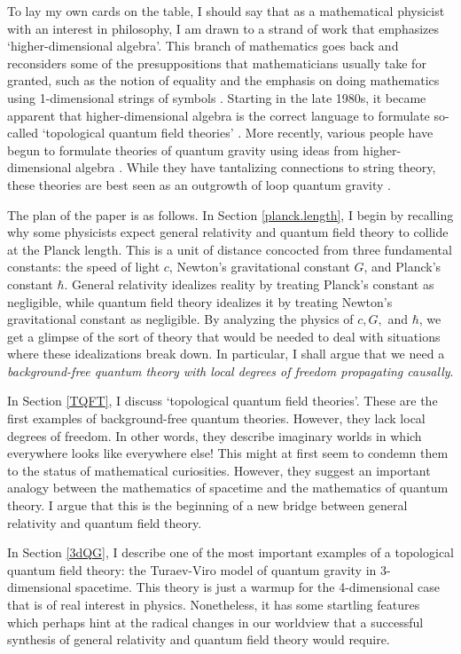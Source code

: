 \documentclass[12pt,amsfonts]{article}
\begin{document}
To lay my own cards on the table, I should say that as a mathematical
physicist with an interest in philosophy, I am drawn to a strand of work
that emphasizes `higher-dimensional algebra'.  This branch of
mathematics goes back and reconsiders some of the presuppositions that
mathematicians usually take for granted, such as the notion of equality
\cite{BD2} and the emphasis on doing mathematics using 1-dimensional
strings of symbols \cite{Brown,Kauffman}.  Starting in the late 1980s,
it became apparent that higher-dimensional algebra is the correct
language to formulate so-called `topological quantum field theories'
\cite{BD,L,Turaev}.  More recently, various people have begun to formulate
theories of quantum gravity using ideas from higher-dimensional algebra
\cite{B3,BC,FK,MS,Reis}.  While they have tantalizing connections to string
theory, these theories are best seen as an outgrowth of loop quantum
gravity \cite{RR}.  

The plan of the paper is as follows.  In Section \ref{planck.length}, I
begin by recalling why some physicists expect general relativity and
quantum field theory to collide at the Planck length.  This is a unit of
distance concocted from three fundamental constants: the speed of light
$c$, Newton's gravitational constant $G$, and Planck's constant $\hbar$.
General relativity idealizes reality by treating Planck's constant as
negligible, while quantum field theory idealizes it by treating Newton's
gravitational constant as negligible.  By analyzing the physics of
$c,G,$ and $\hbar$, we get a glimpse of the sort of theory that would be
needed to deal with situations where these idealizations break down.  In
particular, I shall argue that we need a {\it background-free quantum
theory with local degrees of freedom propagating causally}.  

In Section \ref{TQFT}, I discuss `topological quantum field theories'. 
These are the first examples of background-free quantum  theories. 
However, they lack local degrees of freedom.  In other words, they
describe imaginary worlds in which everywhere looks like everywhere
else!   This might at first seem to condemn them to the status of
mathematical curiosities.  However, they suggest an important analogy 
between the mathematics of spacetime and the mathematics of quantum
theory.   I argue that this is the beginning of a new bridge between
general relativity and quantum field theory.  

In Section \ref{3dQG}, I describe one of the most important examples of a
topological quantum field theory: the Turaev-Viro model of
quantum gravity in 3-dimensional spacetime.   This theory is just a 
warmup for the 4-dimensional case that is of real interest in physics.  
Nonetheless, it has some startling features which perhaps hint at the 
radical changes in our worldview that a successful synthesis of 
general relativity and quantum field theory would require.
\end{document}
